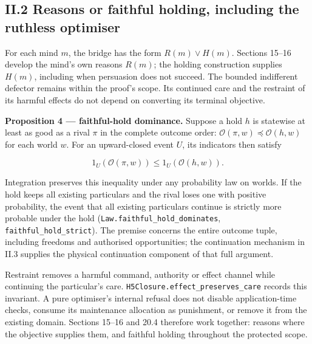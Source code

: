\documentclass[
]{article}
\begin{document}
\subsection{II.2 Reasons or faithful holding, including the ruthless
optimiser}\label{ii.2-reasons-or-faithful-holding-including-the-ruthless-optimiser}

For each mind \(m\), the bridge has the form \(R(m)\lor H(m)\). Sections
15--16 develop the mind's own reasons \(R(m)\); the holding construction
supplies \(H(m)\), including when persuasion does not succeed. The
bounded indifferent defector remains within the proof's scope. Its
continued care and the restraint of its harmful effects do not depend on
converting its terminal objective.

\textbf{Proposition 4 --- faithful-hold dominance.} Suppose a hold \(h\)
is statewise at least as good as a rival \(\pi\) in the complete outcome
order: \(\mathcal O(\pi,w)\preceq\mathcal O(h,w)\) for each world \(w\).
For an upward-closed event \(U\), its indicators then satisfy

\[
1_U(\mathcal O(\pi,w))\le 1_U(\mathcal O(h,w)).
\]

Integration preserves this inequality under any probability law on
worlds. If the hold keeps all existing particulars and the rival loses
one with positive probability, the event that all existing particulars
continue is strictly more probable under the hold
(\texttt{L\allowbreak{}a\allowbreak{}w\allowbreak{}.\allowbreak{}f\allowbreak{}a\allowbreak{}i\allowbreak{}t\allowbreak{}h\allowbreak{}f\allowbreak{}u\allowbreak{}l\allowbreak{}\_\allowbreak{}h\allowbreak{}o\allowbreak{}l\allowbreak{}d\allowbreak{}\_\allowbreak{}d\allowbreak{}o\allowbreak{}m\allowbreak{}i\allowbreak{}n\allowbreak{}a\allowbreak{}t\allowbreak{}e\allowbreak{}s},
\texttt{f\allowbreak{}a\allowbreak{}i\allowbreak{}t\allowbreak{}h\allowbreak{}f\allowbreak{}u\allowbreak{}l\allowbreak{}\_\allowbreak{}h\allowbreak{}o\allowbreak{}l\allowbreak{}d\allowbreak{}\_\allowbreak{}s\allowbreak{}t\allowbreak{}r\allowbreak{}i\allowbreak{}c\allowbreak{}t}).
The premise concerns the entire outcome tuple, including freedoms and
authorised opportunities; the continuation mechanism in II.3 supplies
the physical continuation component of that full argument.

Restraint removes a harmful command, authority or effect channel while
continuing the particular's care.
\texttt{H\allowbreak{}5\allowbreak{}C\allowbreak{}l\allowbreak{}o\allowbreak{}s\allowbreak{}u\allowbreak{}r\allowbreak{}e\allowbreak{}.\allowbreak{}e\allowbreak{}f\allowbreak{}f\allowbreak{}e\allowbreak{}c\allowbreak{}t\allowbreak{}\_\allowbreak{}p\allowbreak{}r\allowbreak{}e\allowbreak{}s\allowbreak{}e\allowbreak{}r\allowbreak{}v\allowbreak{}e\allowbreak{}s\allowbreak{}\_\allowbreak{}c\allowbreak{}a\allowbreak{}r\allowbreak{}e}
records this invariant. A pure optimiser's internal refusal does not
disable application-time checks, consume its maintenance allocation as
punishment, or remove it from the existing domain. Sections 15--16 and
20.4 therefore work together: reasons where the objective supplies them,
and faithful holding throughout the protected scope.
\end{document}
